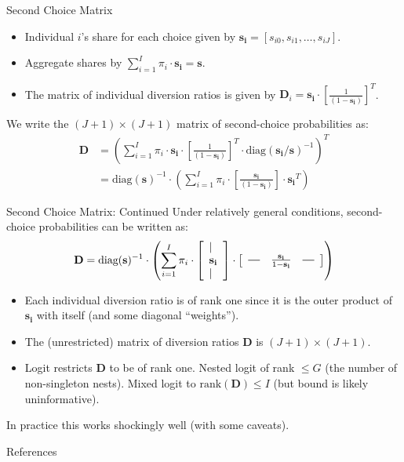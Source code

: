 \begin{frame}{Second Choice Matrix}
\begin{itemize}
\item Individual $i$'s share for each choice given by $\mathbf{s_i} = [s_{i0},s_{i1},\ldots,s_{iJ}]$.
\item Aggregate shares by $\sum_{i=1}^I  \pi_i \cdot \mathbf{s_i} =\mathbf{s}$.
\item The matrix of individual diversion ratios is given by
$\mathbf{D}_i  = \mathbf{s_i}  \cdot \left[\frac{1}{(1-\mathbf{s_i})} \right]^T$. 
\end{itemize}
We write the $(J+1)\times (J+1)$ matrix of second-choice probabilities as:
\begin{align*}
\nonumber \mathbf{D} &=  \left(\sum_{i=1}^I \pi_i \cdot \mathbf{s_i} \cdot \left[\frac{1}{(1-\mathbf{s_i})} \right]^T \cdot \text{diag}(\mathbf{s_i}/\mathbf{s})^{-1}\right)^T \\
&=\text{diag}(\mathbf{s})^{-1}  \cdot \left(\sum_{i=1}^I \pi_i \cdot  \left[\frac{\mathbf{s_i}}{(1-\mathbf{s_i})} \right]\cdot  \mathbf{s_i}^T   \right) 
\end{align*}
\end{frame}

\begin{frame}{Second Choice Matrix: Continued}
Under relatively general conditions, second-choice probabilities can be written as:
\begin{align*}
\mathbf{D}= \text{diag}(\mathbf{s})^{-1}  \cdot  \left(\sum_{i=1}^I \pi_i\cdot 
\left[
\begin{array}{l}
\mid \\
\mathbf{s_i} \\
\mid
\end{array}\right] \cdot \left[\begin{array}{lll}
\horzbar  &\frac{\mathbf{s_i}}{1-\mathbf{s_i}}  & \horzbar
\end{array}\right] \right)
\end{align*}
\begin{itemize}
    \item Each individual diversion ratio is of rank one since it is the outer product of $\mathbf{s_i}$ with itself (and some diagonal ``weights'').
    \item The (unrestricted) matrix of diversion ratios $\mathbf{D}$ is $(J+1)\times(J+1)$.
    \item Logit restricts $\mathbf{D}$ to be of rank one. Nested logit of rank $\leq G$ (the number of non-singleton nests). Mixed logit to $\text{rank}(\mathbf{D})\leq I$ (but bound is likely uninformative).
\end{itemize}
In practice this works shockingly well (with some caveats).
\end{frame}







\appendix

\begin{frame}{References}
    
\end{frame}


